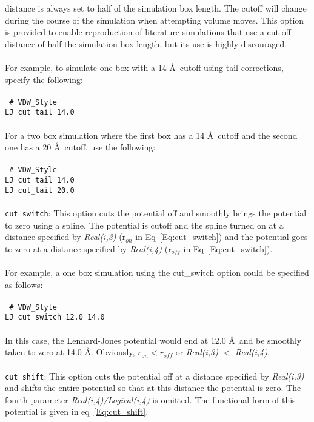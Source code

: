distance is always set to half of the simulation box length. The
cutoff will change during the course of the simulation when attempting
volume moves.  This option is provided to enable reproduction of
literature simulations that use a cut off distance of half the
simulation box length, but its use is highly discouraged. \\ \\ 
%
For example, to simulate one box with a 14 \AA\ cutoff using tail
corrections, specify the following:
\\ \\
\texttt{
\# VDW\_Style \\
LJ cut\_tail 14.0 } \\ \\
%
For a two box simulation where the first box has a 14 \AA\ cutoff and
the second one has a 20 \AA\ cutoff, use the
following:
\\ \\
\texttt{
\# VDW\_Style \\
LJ cut\_tail 14.0 \\ 
LJ cut\_tail 20.0 } \\ \\
%
\texttt{cut\_switch}: This option cuts the potential off and smoothly
brings the potential to zero using a spline. The potential is cutoff
and the spline turned on at a distance specified by \emph{Real(i,3)}
(r$_{on}$ in Eq~\ref{Eq:cut_switch}) and the potential goes
to zero at a distance specified by \emph{Real(i,4)} (r$_{off}$ in
Eq~\ref{Eq:cut_switch}). \\ \\ 
% 
For example, a one box simulation using the cut\_switch option could be
specified as follows:
\\ \\
\texttt{
\# VDW\_Style \\
LJ cut\_switch 12.0 14.0} \\ \\
%
In this case, the Lennard-Jones potential would end at 12.0 \AA\ and
be smoothly taken to zero at 14.0 \AA. Obviously, $r_{on} < r_{off}$ or \emph{Real(i,3)} $<$ \emph{Real(i,4)}.
%
\\ \\
\texttt{cut\_shift}: This option cuts the potential off at a distance
specified by \emph{Real(i,3)} and shifts the entire potential so that
at this distance the potential is zero. The fourth parameter
\emph{Real(i,4)/Logical(i,4)} is omitted. The functional form of this
potential is given in eq~\ref{Eq:cut_shift}. \\ \\
